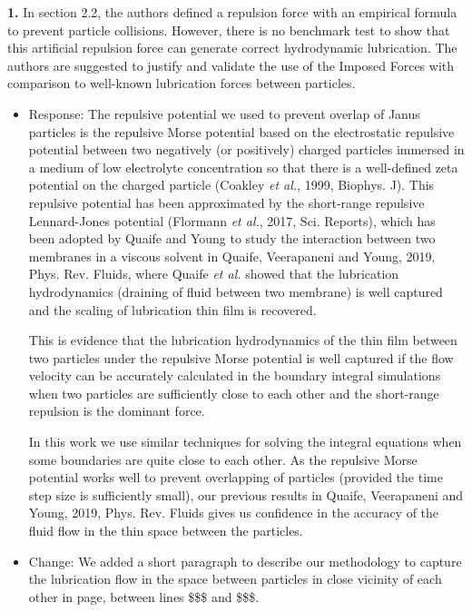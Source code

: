 \documentclass[11pt]{article}
\newcommand{\comment}[1]{{\color{blue} #1}}
\begin{document}
\noindent
\comment{{\bf 1.} In section 2.2, the authors defined a repulsion force with an
empirical formula to prevent particle collisions. However, there is no
benchmark test to show that this artificial repulsion force can generate
correct hydrodynamic lubrication. The authors are suggested to justify
and validate the use of the Imposed Forces with comparison to well-known
lubrication forces between particles.}
\begin{itemize}
  \item Response: The repulsive potential we used to prevent overlap of Janus particles is the repulsive Morse potential based on the electrostatic repulsive potential between two negatively (or positively) charged particles immersed in a medium of low electrolyte concentration so that there is a well-defined zeta potential on the charged particle (Coakley {\sl et al.}, 1999, Biophys. J). This repulsive potential has been approximated by the short-range repulsive Lennard-Jones potential (Flormann {\sl et al.}, 2017, Sci. Reports), which has been adopted by Quaife and Young to study the interaction between two membranes in a viscous solvent in Quaife, Veerapaneni and Young, 2019, Phys. Rev. Fluids, where Quaife {\sl et al.} showed that the lubrication hydrodynamics (draining of fluid between two membrane) is well captured and the scaling of lubrication thin film is recovered. 
  
This is evidence that the lubrication hydrodynamics of the thin film between two particles under the repulsive Morse potential is well captured  if the flow velocity can be accurately calculated in the boundary integral simulations when two particles are sufficiently close to each other and the short-range repulsion is the dominant force. 

In this work we use similar techniques for solving the integral equations when some boundaries are quite close to each other.  As the repulsive Morse potential works well to prevent overlapping of particles (provided the time step size is sufficiently small), our previous results in Quaife, Veerapaneni and Young, 2019, Phys. Rev. Fluids gives us confidence in the accuracy of the fluid flow in the thin space between the particles.

\item Change: We added a short paragraph to describe our methodology to capture the lubrication flow in the space between particles in close vicinity of each other in page, between lines \$\$\$ and \$\$\$.

\end{itemize}
\end{document}
